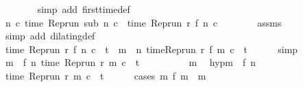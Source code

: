 \begin{isabellebody}
\ \ \ \ \ \ \isamarkupfalse%
\ {\isacharparenleft}simp\ add{\isacharcolon}\ first{\isacharunderscore}time{\isacharunderscore}def{\isacharparenright}\isanewline
\ \ \isamarkupfalse%
\ \isamarkupfalse%
\ {\isacartoucheopen}{\isasymforall}n\ c{\isachardot}\ time\ {\isacharparenleft}Rep{\isacharunderscore}run\ sub\ n\ c{\isacharparenright}\ {\isacharequal}\ time\ {\isacharparenleft}Rep{\isacharunderscore}run\ r\ {\isacharparenleft}f\ n{\isacharparenright}\ c{\isacharparenright}{\isacartoucheclose}\isanewline
\ \ \ \ \ \ \isamarkupfalse%
\ assms{\isacharparenleft}{}{\isacharparenright}\ \isamarkupfalse%
\ {\isacharparenleft}simp\ add{\isacharcolon}\ dilating{\isacharunderscore}def{\isacharparenright}\isanewline
\ \ \isamarkupfalse%
\ \isamarkupfalse%
\ {\isacharasterisk}{\isacharasterisk}{\isacharcolon}{\isacartoucheopen}time\ {\isacharparenleft}{\isacharparenleft}Rep{\isacharunderscore}run\ r{\isacharparenright}\ {\isacharparenleft}f\ n{\isacharparenright}\ c{\isacharparenright}\ {\isacharequal}\ t\ {\isasymand}\ {\isacharparenleft}{\isasymforall}m\ {\isacharless}\ n{\isachardot}\ time{\isacharparenleft}{\isacharparenleft}Rep{\isacharunderscore}run\ r{\isacharparenright}\ {\isacharparenleft}f\ m{\isacharparenright}\ c{\isacharparenright}\ {\isacharless}\ t{\isacharparenright}{\isacartoucheclose}\isanewline
\ \ \ \ \isamarkupfalse%
\ simp\isanewline
\ \ \isamarkupfalse%
\ {\isacartoucheopen}{\isasymforall}m\ {\isacharless}\ f\ n{\isachardot}\ time\ {\isacharparenleft}{\isacharparenleft}Rep{\isacharunderscore}run\ r{\isacharparenright}\ m\ c{\isacharparenright}\ {\isacharless}\ t{\isacartoucheclose}\isanewline
\ \ \isamarkupfalse%
\ {\isacharminus}\isanewline
\ \ \isacommand{{\isacharbraceleft}}\isamarkupfalse%
\ \isamarkupfalse%
\ m\ \isamarkupfalse%
\ hyp{\isacharcolon}{\isacartoucheopen}m\ {\isacharless}\ f\ n{\isacartoucheclose}\isanewline
\ \ \ \ \isamarkupfalse%
\ {\isacartoucheopen}time\ {\isacharparenleft}{\isacharparenleft}Rep{\isacharunderscore}run\ r{\isacharparenright}\ m\ c{\isacharparenright}\ {\isacharless}\ t{\isacartoucheclose}\isanewline
\ \ \ \ \isamarkupfalse%
\ {\isacharparenleft}cases\ {\isacartoucheopen}{\isasymexists}m\ f\ m\ {\isacharequal}\ m{\isacartoucheclose}{\isacharparenright}\isanewline
\ \ \ \ \ \ \isamarkupfalse%

\end{isabellebody}
